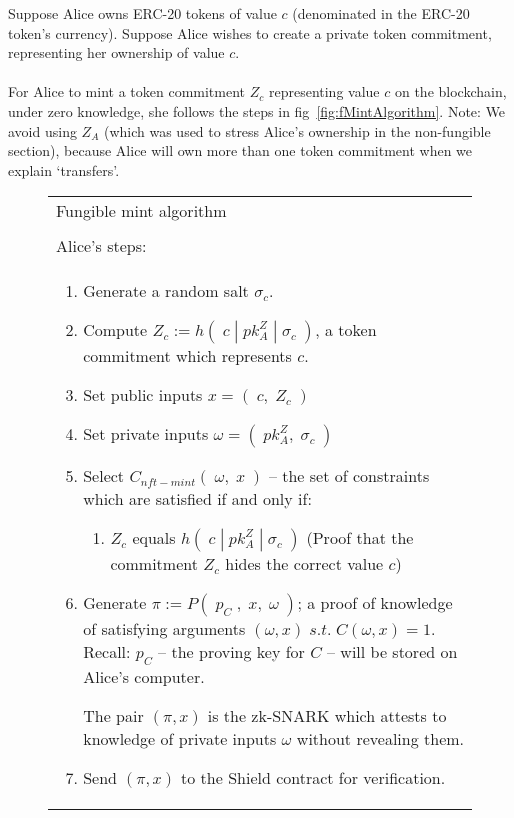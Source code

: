 \documentclass{article}
\begin{document}
\noindent
Suppose Alice owns ERC-20 tokens of value $c$
(denominated in the ERC-20 token's currency).
Suppose Alice wishes to create a private token commitment, representing her ownership of value $c$.\\
\\
For Alice to mint a token commitment $Z_c$ representing value $c$ on the blockchain, under zero knowledge, she follows the steps in fig~\ref{fig:fMintAlgorithm}. Note: We avoid using $Z_A$ (which was used to stress Alice's ownership in the non-fungible section), because Alice will own more than one token commitment when we explain `transfers'.
\\



\newpage
\begin{figure}[H]
	\begin{center}
		\begin{framed}
      \begin{tabular}{p{16cm}}
        Fungible mint algorithm \\
        \\
        \hline
        Alice's steps:\\
        \begin{enumerate}
				  \item Generate a random salt $\sigma_c$.
				  \item Compute $Z_c := h(\;c\;|\;pk^Z_A\;|\;\sigma_c\;)$, a token commitment which represents $c$.
          \item Set public inputs $x = (\;c,\;Z_c\;)$
          \item Set private inputs $\omega = (\;pk_A^Z,\;\sigma_c\;)$
          \item Select $C_{nft-mint}(\;\omega,\;x\;)$ -- the set of constraints which are satisfied if and only if:
          \begin{enumerate}
            \item $Z_c$ equals $h(\;c\;|\;pk_A^Z\;|\;\sigma_c\;)$ (Proof that the commitment $Z_c$ hides the correct value $c$)
          \end{enumerate}
          \item Generate $\pi := P(\;p_C\;,\;x,\;\omega\;)$; a proof of knowledge of satisfying arguments $(\omega, x)\;s.t.\;C(\omega, x) = 1$. Recall: $p_C$ -- the proving key for $C$ -- will be stored on Alice's computer.

          The pair $(\pi, x)$ is the zk-SNARK which attests to knowledge of private inputs $\omega$ without revealing them.
          \item Send $(\pi, x)$ to the Shield contract for verification.


\end{enumerate}
\end{tabular}
\end{framed}
\end{center}
\end{figure}
\end{document}
